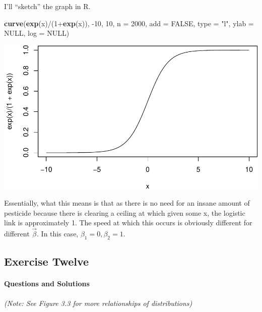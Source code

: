 \documentclass[]{article}
\newenvironment{Shaded}{\begin{snugshade}}{\end{snugshade}}
\newcommand{\KeywordTok}[1]{\textcolor[rgb]{0.13,0.29,0.53}{\textbf{{#1}}}}
\newcommand{\DataTypeTok}[1]{\textcolor[rgb]{0.13,0.29,0.53}{{#1}}}
\newcommand{\DecValTok}[1]{\textcolor[rgb]{0.00,0.00,0.81}{{#1}}}
\newcommand{\StringTok}[1]{\textcolor[rgb]{0.31,0.60,0.02}{{#1}}}
\newcommand{\OtherTok}[1]{\textcolor[rgb]{0.56,0.35,0.01}{{#1}}}
\newcommand{\NormalTok}[1]{{#1}}
\let\oldparagraph\paragraph
\renewcommand{\paragraph}[1]{\oldparagraph{#1}\mbox{}}
\begin{document}
I'll ``sketch'' the graph in R.

\begin{Shaded}
\begin{Highlighting}[]
\KeywordTok{curve}\NormalTok{(}\KeywordTok{exp}\NormalTok{(x)/(}\DecValTok{1}\NormalTok{+}\KeywordTok{exp}\NormalTok{(x)), -}\DecValTok{10}\NormalTok{, }\DecValTok{10}\NormalTok{, }\DataTypeTok{n =} \DecValTok{2000}\NormalTok{, }\DataTypeTok{add =} \OtherTok{FALSE}\NormalTok{, }\DataTypeTok{type =} \StringTok{"l"}\NormalTok{,}
      \DataTypeTok{ylab =} \OtherTok{NULL}\NormalTok{, }\DataTypeTok{log =} \OtherTok{NULL}\NormalTok{)}
\end{Highlighting}
\end{Shaded}

\includegraphics{Exercises_files/figure-latex/unnamed-chunk-1-1.pdf}

Essentially, what this means is that as there is no need for an insane
amount of pesticide because there is clearing a ceiling at which given
some x, the logistic link is approximately 1. The speed at which this
occurs is obviously different for different \(\vec{\beta}\). In this
case, \(\beta_1 = 0, \beta_2 = 1\).

\pagebreak

\subsection{Exercise Twelve}\label{exercise-twelve}

\paragraph{Questions and Solutions}\label{questions-and-solutions-1}

\emph{(Note: See Figure 3.3 for more relationships of distributions)}
\end{document}
